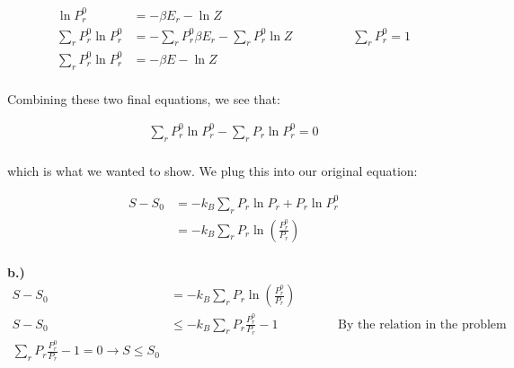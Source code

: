\documentclass[10pt]{article} %
\begin{document}
\begin{align*}
  \ln P_r^0 &= -\beta E_r - \ln Z\\
  \sum_r P_r^0\ln P_r^0 &= -\sum_r P_r^0\beta E_r - \sum_r P_r^0\ln Z
  \hspace{2cm}\sum_r P_r^0=1\\
  \sum_r P_r^0\ln P_r^0 &= -\beta E - \ln Z\\
\end{align*}

Combining these two final equations, we see that:

\begin{align*}
  \sum_r P_r^0\ln P_r^0 - \sum_r P_r\ln P_r^0 = 0\\
\end{align*}

which is what we wanted to show. We plug this into our original equation:

\begin{align*}
  S - S_0 &= -k_B\sum_rP_r\ln P_r + P_r\ln P_r^0\\
  &= -k_B\sum_r P_r \ln\left(\frac{P_r^0}{P_r}\right)\\
\end{align*}

\textbf{b.)}
\begin{align*}
  S - S_0 &= -k_B\sum_r P_r \ln\left(\frac{P_r^0}{P_r}\right)\\
  S - S_0 &\leq -k_B\sum_r P_r \frac{P_r^0}{P_r} - 1
  \hspace{2cm}\mbox{By the relation in the problem}\\
  \sum_r P_r \frac{P_r^0}{P_r} -1 = 0 \rightarrow S \leq S_0\\
\end{align*}
\end{document}
